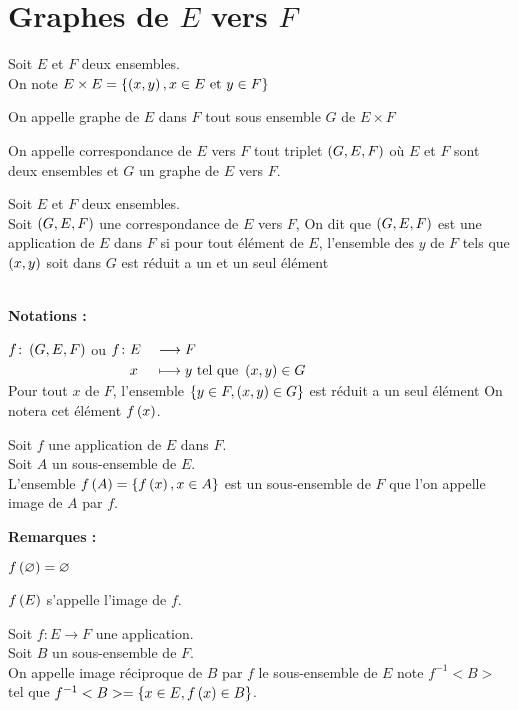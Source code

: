 \documentclass[12pt,twoside,a4paper]{article}
\author{MPSI 2}
\begin{document}
	\maketitle
	\section{Graphes de $E$ vers $F$}
		Soit $E$ et $F$ deux ensembles. \\
		On note $E\times E=\{\left(x,y\right),x\in E\text{ et } y\in F\}$
		\begin{defi}
			On appelle graphe de $E$ dans $F$ tout sous ensemble $G$ de $E\times F$
		\end{defi}
		\begin{defi}
			On appelle correspondance de $E$ vers $F$ tout triplet $\left(G,E,F\right)$ o\`u $E$ et $F$ sont deux ensembles et $G$ un graphe de $E$ vers $F$.
		\end{defi}
		\begin{defi}
			Soit $E$ et $F$ deux ensembles. \\
			Soit $\left(G,E,F\right)$ une correspondance de $E$ vers $F$, On dit que $\left(G,E,F\right)$ est une application de $E$ dans $F$ si pour tout \'el\'ement de $E$, l'ensemble des $y$ de $F$ tels que $\left(x,y\right)$ soit dans $G$ est r\'eduit a un et un seul \'el\'ement
		\end{defi}\ \\
		\textbf{Notations :}
		\begin{tab}
			$f\colon\left(G,E,F\right)$ ou $\begin{aligned}[t]f\colon&E&&\longrightarrow F \\&x&&\longmapsto y\text{ tel que }\left(x,y\right)\in G\end{aligned}$  \\
			Pour tout $x$ de $F$, l'ensemble $\{y\in F,\left(x,y\right)\in G\}$ est r\'eduit a un seul \'el\'ement On notera cet \'el\'ement $f\left(x\right)$.
		\end{tab}
		\begin{defi}
			Soit $f$ une application de $E$ dans $F$. \\
			Soit $A$ un sous-ensemble de $E$. \\
			L'ensemble $f\left(A\right)=\{f\left(x\right),x\in A\}$ est un sous-ensemble de $F$ que l'on appelle image de $A$ par $f$.
		\end{defi}\newpage
		\textbf{Remarques :}
		\begin{liste}
			\item $f\left(\varnothing\right)=\varnothing$
			\item $f\left(E\right)$ s'appelle l'image de $f$.
		\end{liste}
		\begin{defi}
			Soit $f\colon E\longrightarrow F$ une application. \\
			Soit $B$ un sous-ensemble de $F$. \\
			On appelle image r\'eciproque de $B$ par $f$ le sous-ensemble de $E$ note $f^{-1}<B>$ tel que $f^{-1}<B>=\{x\in E,f\left(x\right)\in B\}$.
		\end{defi}\ \\
\end{document}
